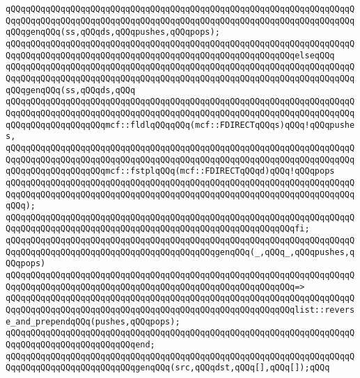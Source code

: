 \verb|qQQqqQQqqQQqqQQqqQQqqQQqqQQqqQQqqQQqqQQqqQQqqQQqqQQqqQQqqQQqqQQqqQQqqQQqqQQqqQQqqQQqqQQqqQQqqQQqqQQqqQQqqQQqqQQqqQQqqQQqqQQqqQQqqQQqqQQqqQQqqQQqgenqQQq(ss,qQQqds,qQQqpushes,qQQqpops);|\newline
\verb|qQQqqQQqqQQqqQQqqQQqqQQqqQQqqQQqqQQqqQQqqQQqqQQqqQQqqQQqqQQqqQQqqQQqqQQqqQQqqQQqqQQqqQQqqQQqqQQqqQQqqQQqqQQqqQQqqQQqqQQqqQQqqQQqelseqQQq|\newline
\verb|qQQqqQQqqQQqqQQqqQQqqQQqqQQqqQQqqQQqqQQqqQQqqQQqqQQqqQQqqQQqqQQqqQQqqQQqqQQqqQQqqQQqqQQqqQQqqQQqqQQqqQQqqQQqqQQqqQQqqQQqqQQqqQQqqQQqqQQqqQQqqQQqgenqQQq(ss,qQQqds,qQQq|\newline
\verb|qQQqqQQqqQQqqQQqqQQqqQQqqQQqqQQqqQQqqQQqqQQqqQQqqQQqqQQqqQQqqQQqqQQqqQQqqQQqqQQqqQQqqQQqqQQqqQQqqQQqqQQqqQQqqQQqqQQqqQQqqQQqqQQqqQQqqQQqqQQqqQQqqQQqqQQqqQQqqQQqmcf::fldlqQQqqQQq(mcf::FDIRECTqQQqs)qQQq!qQQqpushes,|\newline
\verb|qQQqqQQqqQQqqQQqqQQqqQQqqQQqqQQqqQQqqQQqqQQqqQQqqQQqqQQqqQQqqQQqqQQqqQQqqQQqqQQqqQQqqQQqqQQqqQQqqQQqqQQqqQQqqQQqqQQqqQQqqQQqqQQqqQQqqQQqqQQqqQQqqQQqqQQqqQQqqQQqmcf::fstplqQQq(mcf::FDIRECTqQQqd)qQQq!qQQqpops|\newline
\verb|qQQqqQQqqQQqqQQqqQQqqQQqqQQqqQQqqQQqqQQqqQQqqQQqqQQqqQQqqQQqqQQqqQQqqQQqqQQqqQQqqQQqqQQqqQQqqQQqqQQqqQQqqQQqqQQqqQQqqQQqqQQqqQQqqQQqqQQqqQQqqQQq);|\newline
\verb|qQQqqQQqqQQqqQQqqQQqqQQqqQQqqQQqqQQqqQQqqQQqqQQqqQQqqQQqqQQqqQQqqQQqqQQqqQQqqQQqqQQqqQQqqQQqqQQqqQQqqQQqqQQqqQQqqQQqqQQqqQQqqQQqfi;|\newline
\newline
\verb|qQQqqQQqqQQqqQQqqQQqqQQqqQQqqQQqqQQqqQQqqQQqqQQqqQQqqQQqqQQqqQQqqQQqqQQqqQQqqQQqqQQqqQQqqQQqqQQqqQQqqQQqqQQqqQQqgenqQQq(_,qQQq_,qQQqpushes,qQQqpops)|\newline
\verb|qQQqqQQqqQQqqQQqqQQqqQQqqQQqqQQqqQQqqQQqqQQqqQQqqQQqqQQqqQQqqQQqqQQqqQQqqQQqqQQqqQQqqQQqqQQqqQQqqQQqqQQqqQQqqQQqqQQqqQQqqQQqqQQq=>|\newline
\verb|qQQqqQQqqQQqqQQqqQQqqQQqqQQqqQQqqQQqqQQqqQQqqQQqqQQqqQQqqQQqqQQqqQQqqQQqqQQqqQQqqQQqqQQqqQQqqQQqqQQqqQQqqQQqqQQqqQQqqQQqqQQqqQQqlist::reverse_and_prependqQQq(pushes,qQQqpops);|\newline
\verb|qQQqqQQqqQQqqQQqqQQqqQQqqQQqqQQqqQQqqQQqqQQqqQQqqQQqqQQqqQQqqQQqqQQqqQQqqQQqqQQqqQQqqQQqqQQqqQQqend;|\newline
\newline
\verb|qQQqqQQqqQQqqQQqqQQqqQQqqQQqqQQqqQQqqQQqqQQqqQQqqQQqqQQqqQQqqQQqqQQqqQQqqQQqqQQqqQQqqQQqqQQqqQQqgenqQQq(src,qQQqdst,qQQq[],qQQq[]);qQQq|\newline
